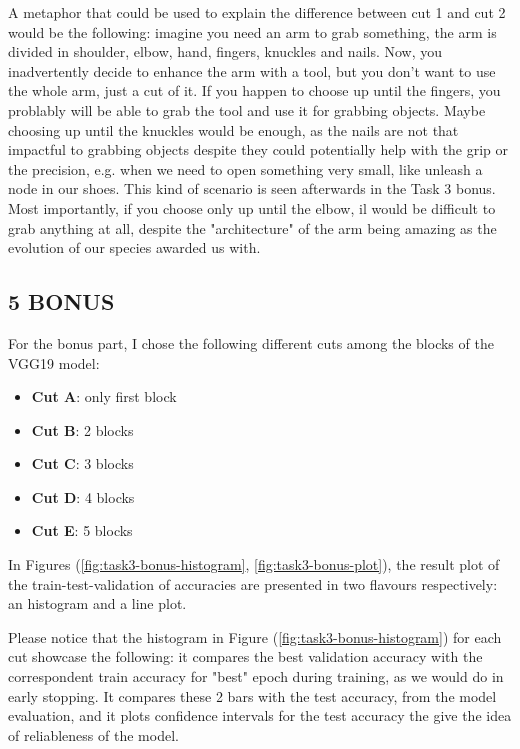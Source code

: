\documentclass[11pt]{scrartcl}
\begin{document}
A metaphor that could be used to explain the difference between cut 1 and cut 2
would be the following:
imagine you need an arm to grab something,
the arm is divided in shoulder, elbow, hand, fingers, knuckles and nails.
Now, you inadvertently decide to enhance the arm with a tool,
but you don't want to use the whole arm,
just a cut of it.
If you happen to choose up until the fingers, you problably 
will be able to grab the tool and use it for grabbing objects.
Maybe choosing up until the knuckles would be enough,
as the nails are not that impactful to grabbing objects 
despite they could potentially help with the grip or the precision,
e.g. when we need to open something very small, 
like unleash a node in our shoes.
This kind of scenario is seen afterwards in the Task 3 bonus.
Most importantly, if you choose only up until the elbow,
il would be difficult to grab anything at all,
despite the "architecture" of the arm being amazing 
as the evolution of our species awarded us with. 


\subsection*{5 BONUS}

For the bonus part, I chose the following different cuts among the blocks
of the VGG19 model:

\begin{itemize}
	\item \textbf{Cut A}: only first block
	\item \textbf{Cut B}: 2 blocks
	\item \textbf{Cut C}: 3 blocks
	\item \textbf{Cut D}: 4 blocks
	\item \textbf{Cut E}: 5 blocks
\end{itemize}

In Figures (\ref{fig:task3-bonus-histogram}, \ref{fig:task3-bonus-plot}), 
the result plot of the train-test-validation of accuracies are presented 
in two flavours respectively:
an histogram and a line plot.

Please notice that the histogram in Figure (\ref{fig:task3-bonus-histogram}) 
for each cut showcase the following:
it compares the best validation accuracy with the correspondent train accuracy 
for "best" epoch during training, as we would do in early stopping.
It compares these 2 bars with the test accuracy,
from the model evaluation,
and it plots confidence intervals for the test accuracy
the give the idea of reliableness of the model.
\end{document}
